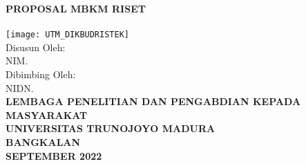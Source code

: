 \begin{titlepage}
\begin{center}
    \textbf{PROPOSAL MBKM RISET}\\[3\baselineskip]

    \textbf{\researchtitle}\\[8\baselineskip]

    \texttt{[image: UTM\_DIKBUDRISTEK]}\\[3\baselineskip]

    Disusun Oleh:\\
    \authorname NIM. \nim\\[1\baselineskip]

    Dibimbing Oleh:\\
    \mentorname NIDN. \nidn\\[9\baselineskip]


    \textbf{LEMBAGA PENELITIAN DAN PENGABDIAN KEPADA MASYARAKAT}\\
    \textbf{UNIVERSITAS TRUNOJOYO MADURA}\\
    \textbf{BANGKALAN}\\
    \textbf{SEPTEMBER 2022}
\end{center}
\end{titlepage}
